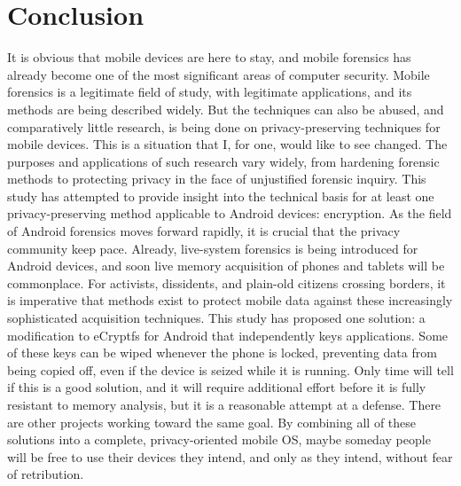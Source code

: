 \chapter{Conclusion}

It is obvious that mobile devices are here to stay, and mobile forensics has already become one of the most significant areas of
computer security.  Mobile forensics is a legitimate field of study, with legitimate applications, and its methods are being
described widely. But the techniques can also be abused, and comparatively little research, is being done on privacy-preserving
techniques for mobile devices.  This is a situation that I, for one, would like to see changed. The purposes and applications of
such research vary widely, from hardening forensic methods to protecting privacy in the face of unjustified forensic inquiry.  This
study has attempted to provide insight into the technical basis for at least one privacy-preserving method applicable to Android
devices: encryption. As the field of Android forensics moves forward rapidly, it is crucial that the privacy community keep pace.
Already, live-system forensics is being introduced for Android devices, and soon live memory acquisition of phones and tablets will
be commonplace. For activists, dissidents, and plain-old citizens crossing borders, it is imperative that methods exist to protect
mobile data against these increasingly sophisticated acquisition techniques. This study has proposed one solution: a modification to
eCryptfs for Android that independently keys applications. Some of these keys can be wiped whenever the phone is locked, preventing
data from being copied off, even if the device is seized while it is running. Only time will tell if this is a good solution, and it
will require additional effort before it is fully resistant to memory analysis, but it is a reasonable attempt at a defense. There
are other projects working toward the same goal. By combining all of these solutions into a complete, privacy-oriented mobile OS,
maybe someday people will be free to use their devices they intend, and only as they intend, without fear of retribution.

